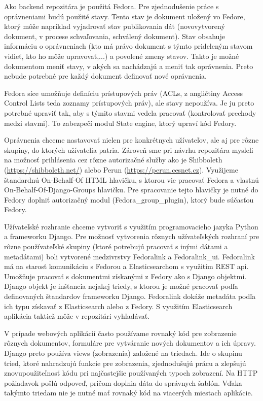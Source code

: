 \documentclass[thesis=M,slovak]{FITthesis}[2013/05/06]
\begin{document}
Ako backend repozitára je použitá Fedora. Pre zjednodušenie práce s oprávneniami budú použité stavy. Tento stav je dokument uložený vo Fedore, ktorý môže napríklad vyjadrovať stav publikovania dát (novovytvorený dokument, v procese schvaľovania, schválený dokument). Stav obsahuje informáciu o oprávneniach (kto má právo dokument s týmto prideleným stavom vidieť, kto ho môže upravovať,...) a povolené zmeny stavov. Takto je možné dokumentom meniť stavy, v akých sa nachádzajú a meniť tak oprávnenia. Preto nebude potrebné pre každý dokument definovať nové oprávnenia.

Fedora síce umožňuje definíciu prístupových práv (ACLs, z angličtiny Access Control Lists teda zoznamy prístupových práv), ale stavy nepoužíva. Je ju preto potrebné upraviť tak, aby s týmito stavmi vedela pracovať (kontrolovať prechody medzi stavmi). To zabezpečí modul State engine, ktorý upraví kód Fedory.

Oprávnenia chceme nastavovať nielen pre konkrétnych užívateľov, ale aj pre rôzne skupiny, do ktorých užívatelia patria. Zároveň sme pri návrhu repozitára mysleli na možnosť prihlásenia cez rôzne autorizačné služby ako je Shibboleth (\url{https://shibboleth.net/}) alebo Perun (\url{https://perun.cesnet.cz}). Využijeme štandardnú On-Behalf-Of HTML hlavičku, s ktorou vie pracovať Fedora a vlastnú On-Behalf-Of-Django-Groups hlavičku. Pre spracovanie tejto hlavičky je nutné do Fedory doplniť autorizačný modul (Fedora\_group\_plugin), ktorý bude súčasťou Fedory.

Užívateľské rozhranie chceme vytvoriť s využitím programovacieho jazyka Python a frameworku Django. Pre možnosť vytvorenia rôznych užívateľských rozhraní pre rôzne používateľské skupiny (ktoré potrebujú pracovať s inými dátami a metadátami) boli vytvorené medzivrstvy Fedoralink a Fedoralink\_ui. Fedoralink má na starosť komunikáciu s Fedorou a Elasticsearchom s využitím REST api. Umožňuje pracovať s dokumentmi získanými z Fedory ako s Django objektmi. Django objekt je inštancia nejakej triedy, s ktorou je možné pracovať podľa definovaných štandardov frameworku Django. Fedoralink dokáže metadáta podľa ich typu získavať z Elasticsearch alebo z Fedory. S využitím Elasticsearch aplikácia taktiež môže v repozitári vyhľadávať.

V prípade webových aplikácií často používame rovnaký kód pre zobrazenie rôznych dokumentov, formuláre pre vytváranie nových dokumentov a ich úpravy. Django preto používa views (zobrazenia) založené na triedach. Ide o skupinu tried, ktoré nahradzujú funkcie pre zobrazenia, zjednodušujú prácu a zlepšujú znovupoužiteľnosť kódu pri najčastejšie používaných typoch zobrazení. Na HTTP požiadavok pošlú odpoveď, pričom doplnia dáta do správnych šablón. Vďaka takýmto triedam nie je nutné mať rovnaký kód na viacerých miestach aplikácie.\cite{DjangoClassBasedViews}
\end{document}
